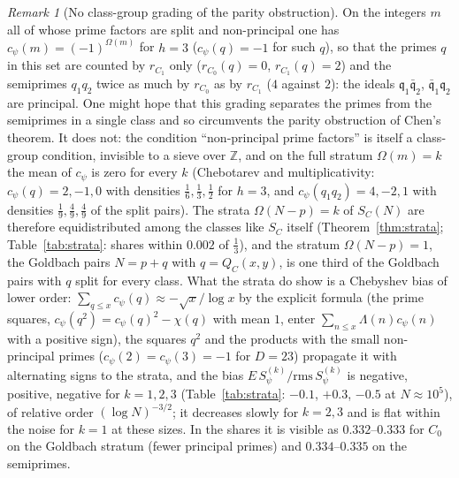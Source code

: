 \documentclass[11pt]{amsart}
\theoremstyle{remark}
\newtheorem{remark}[theorem]{Remark}
\newcommand{\Z}{\mathbb Z}
\begin{document}
\begin{remark}[No class-group grading of the parity obstruction]\label{rem:parity}
On the integers $m$ all of whose prime factors are split and non-principal one has $c_\psi(m)=(-1)^{\Omega(m)}$ for $h=3$ ($c_\psi(q)=-1$ for such $q$), so that the primes $q$ in this set are counted by $r_{C_1}$ only ($r_{C_0}(q)=0$, $r_{C_1}(q)=2$) and the semiprimes $q_1q_2$ twice as much by $r_{C_0}$ as by $r_{C_1}$ ($4$ against $2$): the ideals $\mathfrak q_1\bar{\mathfrak q}_2$, $\bar{\mathfrak q}_1\mathfrak q_2$ are principal. One might hope that this grading separates the primes from the semiprimes in a single class and so circumvents the parity obstruction of Chen's theorem. It does not: the condition ``non-principal prime factors'' is itself a class-group condition, invisible to a sieve over $\Z$, and on the full stratum $\Omega(m)=k$ the mean of $c_\psi$ is zero for every $k$ (Chebotarev and multiplicativity: $c_\psi(q)=2,-1,0$ with densities $\frac16,\frac13,\frac12$ for $h=3$, and $c_\psi(q_1q_2)=4,-2,1$ with densities $\frac19,\frac49,\frac49$ of the split pairs). The strata $\Omega(N-p)=k$ of $S_{C}(N)$ are therefore equidistributed among the classes like $S_C$ itself (Theorem~\ref{thm:strata}; Table~\ref{tab:strata}: shares within $0.002$ of $\frac13$), and the stratum $\Omega(N-p)=1$, the Goldbach pairs $N=p+q$ with $q=Q_C(x,y)$, is one third of the Goldbach pairs with $q$ split for every class. What the strata do show is a Chebyshev bias of lower order: $\sum_{q\le x}c_\psi(q)\approx-\sqrt x/\log x$ by the explicit formula (the prime squares, $c_\psi(q^2)=c_\psi(q)^2-\chi(q)$ with mean $1$, enter $\sum_{n\le x}\Lambda(n)c_\psi(n)$ with a positive sign), the squares $q^2$ and the products with the small non-principal primes ($c_\psi(2)=c_\psi(3)=-1$ for $D=23$) propagate it with alternating signs to the strata, and the bias $E\,S^{(k)}_\psi/\mathrm{rms}\,S^{(k)}_\psi$ is negative, positive, negative for $k=1,2,3$ (Table~\ref{tab:strata}: $-0.1$, $+0.3$, $-0.5$ at $N\approx10^5$), of relative order $(\log N)^{-3/2}$; it decreases slowly for $k=2,3$ and is flat within the noise for $k=1$ at these sizes. In the shares it is visible as $0.332$--$0.333$ for $C_0$ on the Goldbach stratum (fewer principal primes) and $0.334$--$0.335$ on the semiprimes.
\end{remark}
\end{document}
